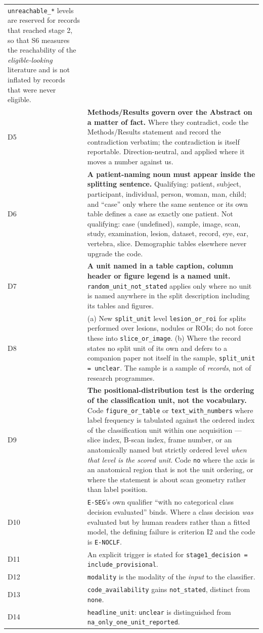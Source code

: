 \documentclass[11pt,a4paper]{article}
\begin{document}
{\begin{longtable}{@{}lL{13.0cm}@{}}
\texttt{unreachable\_*} levels are reserved for records that reached stage 2, so that
S6 measures the reachability of the \emph{eligible-looking} literature and is not
inflated by records that were never eligible. \\
D5 & \textbf{Methods/Results govern over the Abstract on a matter of fact.} Where they
contradict, code the Methods/Results statement and record the contradiction verbatim;
the contradiction is itself reportable. Direction-neutral, and applied where it moves
a number against us. \\
D6 & \textbf{A patient-naming noun must appear inside the splitting sentence.}
Qualifying: patient, subject, participant, individual, person, woman, man, child; and
``case'' only where the same sentence or its own table defines a case as exactly one
patient. Not qualifying: case (undefined), sample, image, scan, study, examination,
lesion, dataset, record, eye, ear, vertebra, slice. Demographic tables elsewhere never
upgrade the code. \\
D7 & \textbf{A unit named in a table caption, column header or figure legend is a
named unit.} \texttt{random\_unit\_not\_stated} applies only where no unit is named
anywhere in the split description including its tables and figures. \\
D8 & (a) New \texttt{split\_unit} level \texttt{lesion\_or\_roi} for splits performed
over lesions, nodules or ROIs; do not force these into \texttt{slice\_or\_image}.
(b) Where the record states no split unit of its own and defers to a companion paper
not itself in the sample, \texttt{split\_unit = unclear}. The sample is a sample of
\emph{records}, not of research programmes. \\
D9 & \textbf{The positional-distribution test is the ordering of the classification
unit, not the vocabulary.} Code \texttt{figure\_or\_table} or
\texttt{text\_with\_numbers} where label frequency is tabulated against the ordered
index of the classification unit within one acquisition --- slice index, B-scan
index, frame number, or an anatomically named but strictly ordered level \emph{when
that level is the scored unit}. Code \texttt{no} where the axis is an anatomical
region that is not the unit ordering, or where the statement is about scan geometry
rather than label position. \\
D10 & \texttt{E-SEG}'s own qualifier ``with no categorical class decision evaluated''
binds. Where a class decision \emph{was} evaluated but by human readers rather than a
fitted model, the defining failure is criterion I2 and the code is \texttt{E-NOCLF}. \\
D11 & An explicit trigger is stated for
\texttt{stage1\_decision = include\_provisional}. \\
D12 & \texttt{modality} is the modality of the \emph{input} to the classifier. \\
D13 & \texttt{code\_availability} gains \texttt{not\_stated}, distinct from
\texttt{none}. \\
D14 & \texttt{headline\_unit}: \texttt{unclear} is distinguished from
\texttt{na\_only\_one\_unit\_reported}. \\
\end{longtable}}
\end{document}
